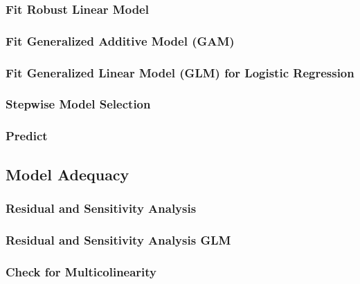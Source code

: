 \subsubsection{Fit Robust Linear Model}


\subsubsection{Fit Generalized Additive Model (GAM)}


\subsubsection{Fit Generalized Linear Model (GLM) for Logistic Regression}


\subsubsection{Stepwise Model Selection}


\subsubsection{Predict}


\subsection{Model Adequacy}

\subsubsection{Residual and Sensitivity Analysis}


\subsubsection{Residual and Sensitivity Analysis GLM}


\subsubsection{Check for Multicolinearity}



